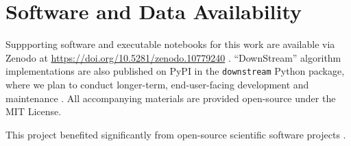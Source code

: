 \section{Software and Data Availability}
\label{sec:materials}

Suppporting software and executable notebooks for this work are available via Zenodo at \url{https://doi.org/10.5281/zenodo.10779240} \citep{moreno2024hsurf}.
``DownStream'' algorithm implementations are also published on PyPI in the \texttt{downstream} Python package, where we plan to conduct longer-term, end-user-facing development and maintenance \citep{moreno2024downstream}.
All accompanying materials are provided open-source under the MIT License.

This project benefited significantly from open-source scientific software projects \citep{2020SciPy-NMeth,harris2020array,reback2020pandas,mckinney-proc-scipy-2010,waskom2021seaborn,hunter2007matplotlib,moreno2023teeplot}.
